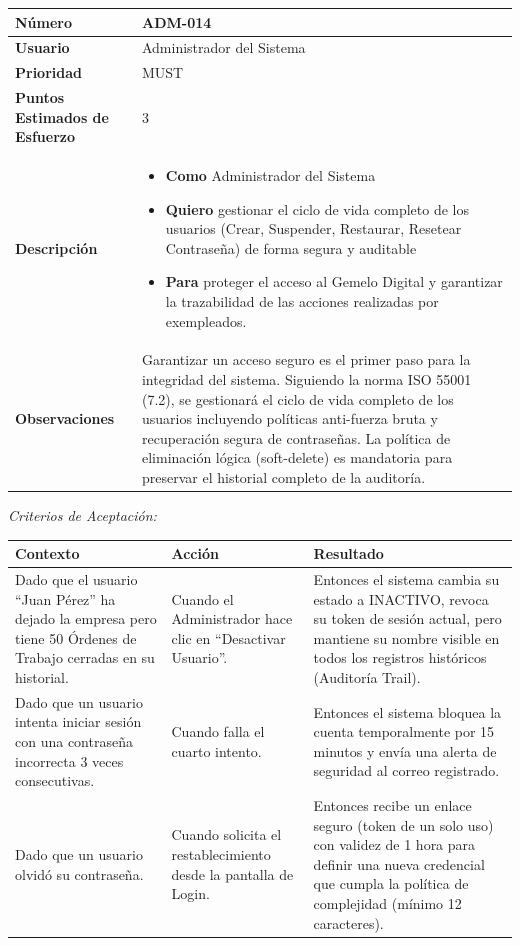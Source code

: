 \begin{longtable}{|p{0.21\textwidth}|p{0.74\textwidth}|}\hline
\textbf{Número} & ADM-014 \\ \hline
\textbf{Usuario} & Administrador del Sistema \\ \hline
\textbf{Prioridad} & MUST \\ \hline
\textbf{Puntos Estimados de Esfuerzo} & 3 \\ \hline
\textbf{Descripción} & \parbox[t]{\linewidth}{\vspace{2pt}\begin{itemize}[leftmargin=1.5em, nosep, topsep=0pt]
\item \textbf{Como} Administrador del Sistema
\item \textbf{Quiero} gestionar el ciclo de vida completo de los usuarios (Crear, Suspender, Restaurar, Resetear Contraseña) de forma segura y auditable
\item \textbf{Para} proteger el acceso al Gemelo Digital y garantizar la trazabilidad de las acciones realizadas por exempleados.
\end{itemize}\vspace{2pt}} \\ \hline
\textbf{Observaciones} & Garantizar un acceso seguro es el primer paso para la integridad del sistema. Siguiendo la norma ISO 55001 (7.2), se gestionará el ciclo de vida completo de los usuarios incluyendo políticas anti-fuerza bruta y recuperación segura de contraseñas. La política de eliminación lógica (soft-delete) es mandatoria para preservar el historial completo de la auditoría. \\ \hline
\end{longtable}\normalsize
\noindent\textit{Criterios de Aceptación:}
\footnotesize\begin{longtable}{|p{0.28\textwidth}|p{0.32\textwidth}|p{0.34\textwidth}|}\hline
\textbf{Contexto} & \textbf{Acción} & \textbf{Resultado} \\ \hline
\parbox[t]{\linewidth}{Dado que el usuario ``Juan Pérez'' ha dejado la empresa pero tiene 50 Órdenes de Trabajo cerradas en su historial.} & \parbox[t]{\linewidth}{Cuando el Administrador hace clic en ``Desactivar Usuario''.} & \parbox[t]{\linewidth}{Entonces el sistema cambia su estado a INACTIVO, revoca su token de sesión actual, pero mantiene su nombre visible en todos los registros históricos (Auditoría Trail).} \\ \hline
\parbox[t]{\linewidth}{Dado que un usuario intenta iniciar sesión con una contraseña incorrecta 3 veces consecutivas.} & \parbox[t]{\linewidth}{Cuando falla el cuarto intento.} & \parbox[t]{\linewidth}{Entonces el sistema bloquea la cuenta temporalmente por 15 minutos y envía una alerta de seguridad al correo registrado.} \\ \hline
\parbox[t]{\linewidth}{Dado que un usuario olvidó su contraseña.} & \parbox[t]{\linewidth}{Cuando solicita el restablecimiento desde la pantalla de Login.} & \parbox[t]{\linewidth}{Entonces recibe un enlace seguro (token de un solo uso) con validez de 1 hora para definir una nueva credencial que cumpla la política de complejidad (mínimo 12 caracteres).} \\ \hline
\end{longtable}\normalsize

